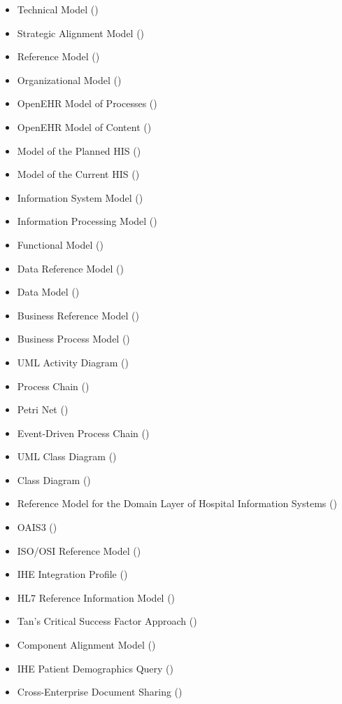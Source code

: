 \begin{itemize}
  \item Technical Model ()
  \item Strategic Alignment Model ()
  \item Reference Model ()
  \item Organizational Model ()
  \item OpenEHR Model of Processes ()
  \item OpenEHR Model of Content ()
  \item Model of the Planned HIS ()
  \item Model of the Current HIS ()
  \item Information System Model ()
  \item Information Processing Model ()
  \item Functional Model ()
  \item Data Reference Model ()
  \item Data Model ()
  \item Business Reference Model ()
  \item Business Process Model ()
  \item UML Activity Diagram ()
  \item Process Chain ()
  \item Petri Net ()
  \item Event-Driven Process Chain ()
  \item UML Class Diagram ()
  \item Class Diagram ()
  \item Reference Model for the Domain Layer of Hospital Information Systems ()
  \item OAIS3 ()
  \item ISO/OSI Reference Model ()
  \item IHE Integration Profile ()
  \item HL7 Reference Information Model ()
  \item Tan’s Critical Success Factor Approach ()
  \item Component Alignment Model ()
  \item IHE Patient Demographics Query ()
  \item Cross-Enterprise Document Sharing ()
\end{itemize}

